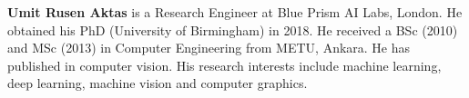 \documentclass{ws-ijhr}
\begin{document}







\vspace*{-5pt}   %


\eject


\noindent%
\parbox{5truein}{
\begin{minipage}[b]{1truein}
\centerline{{}}
\end{minipage}
\hfill         %
\begin{minipage}[b]{3.85truein}
{{\bf Umit Rusen Aktas} is a Research Engineer at Blue Prism AI Labs, London. He obtained his PhD (University of Birmingham) in 2018. He received a BSc (2010) and MSc (2013) in Computer Engineering from METU, Ankara. He has published in computer vision. His research interests include machine learning, deep learning, machine vision and computer graphics.\hfilneg}
\end{minipage}} %
\end{document}
